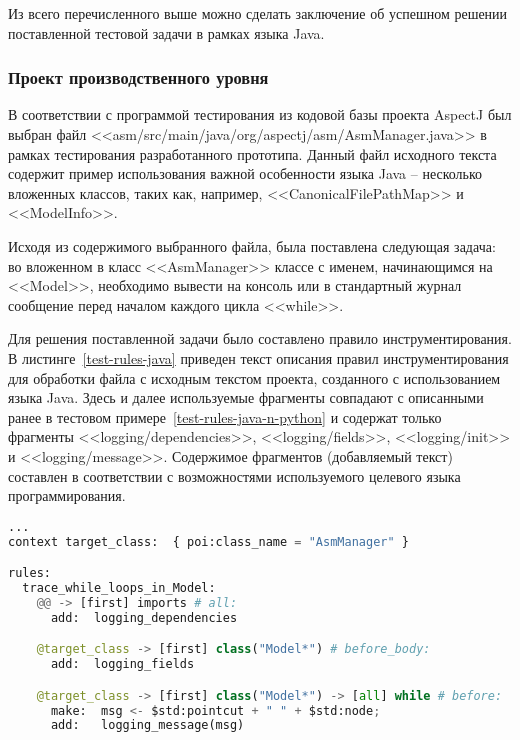 Из всего перечисленного выше можно сделать заключение об успешном решении поставленной тестовой задачи в рамках языка Java.

\subsubsection{Проект производственного уровня}

В соответствии с программой тестирования из кодовой базы проекта AspectJ был выбран файл <<asm/src/main/java/org/aspectj/asm/AsmManager.java>> в рамках тестирования разработанного прототипа.
Данный файл исходного текста содержит пример использования важной особенности языка Java -- несколько вложенных классов, таких как, например, <<CanonicalFilePathMap>> и <<ModelInfo>>.

Исходя из содержимого выбранного файла, была поставлена следующая задача:
во вложенном в класс <<AsmManager>> классе с именем, начинающимся на <<Model>>, необходимо вывести на консоль или в стандартный журнал сообщение перед началом каждого цикла <<while>>.

Для решения поставленной задачи было составлено правило инструментирования.
В листинге~\ref{test-rules-java} приведен текст описания правил инструментирования для обработки файла с исходным текстом проекта, созданного с использованием языка Java.
Здесь и далее используемые фрагменты совпадают с описанными ранее в тестовом примере~\ref{test-rules-java-n-python} и содержат только фрагменты <<logging/dependencies>>, <<logging/fields>>, <<logging/init>> и <<logging/message>>.
Содержимое фрагментов (добавляемый текст) составлен в соответствии с возможностями используемого целевого языка программирования.

\begin{lstlisting}[frame=single, language=Python, label={test-rules-java}, caption={Описание правил инструментирования. Java-проект.}]
...
context target_class:  { poi:class_name = "AsmManager" }

rules:
  trace_while_loops_in_Model:
    @@ -> [first] imports # all:
      add:  logging_dependencies

    @target_class -> [first] class("Model*") # before_body:
      add:  logging_fields

    @target_class -> [first] class("Model*") -> [all] while # before:
      make:  msg <- $std:pointcut + " " + $std:node;
      add:   logging_message(msg)
\end{lstlisting}

